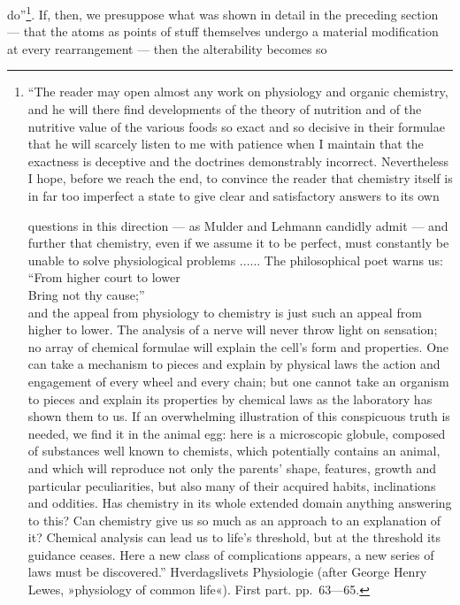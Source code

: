 \documentclass[12pt,a4paper]{book}
\begin{document}
do''\footnote{``The reader may open almost any work on physiology and organic
chemistry, and he will there find developments of the theory of nutrition and
of the nutritive value of the various foods so exact and so decisive in their
formulae that he will scarcely listen to me with patience when I maintain that
the exactness is deceptive and the doctrines demonstrably incorrect.
Nevertheless I hope, before we reach the end, to convince the reader that
chemistry itself is in far too imperfect a state to give clear and satisfactory
answers to its own
\par questions in this direction --- as Mulder and Lehmann candidly admit ---
and further that chemistry, even if we assume it to be perfect, must constantly
be unable to solve physiological problems ...... The philosophical poet warns
us: ``From higher court to lower\\
Bring not thy cause;''\\
and the appeal from physiology to chemistry is just such an appeal from higher
to lower. The analysis of a nerve will never throw light on sensation; no array
of chemical formulae will explain the cell's form and properties. One can take
a mechanism to pieces and explain by physical laws the action and engagement of
every wheel and every chain; but one cannot take an organism to pieces and
explain its properties by chemical laws as the laboratory has shown them to us.
If an overwhelming illustration of this conspicuous truth is needed, we find it
in the animal egg: here is a microscopic globule, composed of substances well
known to chemists, which potentially contains an animal, and which will
reproduce not only the parents' shape, features, growth and particular
peculiarities, but also many of their acquired habits, inclinations and
oddities. Has chemistry in its whole extended domain anything answering to
this? Can chemistry give us so much as an approach to an explanation of it?
Chemical analysis can lead us to life's threshold, but at the threshold its
guidance ceases. Here a new class of complications appears, a new series of
laws must be discovered.'' Hverdagslivets Physiologie (after George Henry Lewes,
»physiology of common life«). First part. pp.~63---65.}. If, then, we
presuppose what was shown in detail in the preceding
\setcounter{footnote}{0}
section --- that the atoms as points of stuff themselves undergo a material
modification at every rearrangement --- then the alterability becomes so
\end{document}
